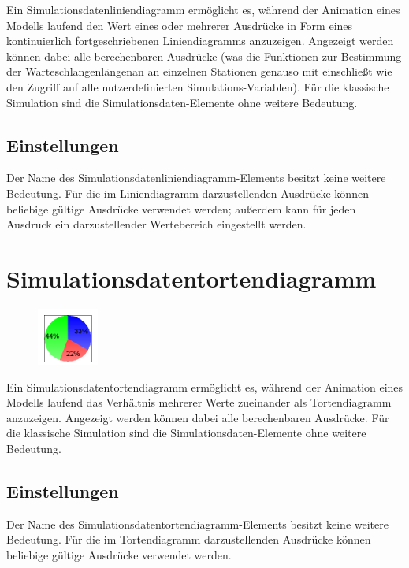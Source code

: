 Ein Simulationsdatenliniendiagramm ermöglicht es, während der Animation eines Modells laufend den Wert
eines oder mehrerer Ausdrücke in Form eines kontinuierlich fortgeschriebenen Liniendiagramms anzuzeigen.
Angezeigt werden können dabei alle berechenbaren Ausdrücke (was die Funktionen zur Bestimmung der
Warteschlangenlängenan an einzelnen Stationen genauso mit einschließt wie den Zugriff auf alle
nutzerdefinierten Simulations-Variablen). Für die klassische Simulation sind die
Simulationsdaten-Elemente ohne weitere Bedeutung.

\subsection*{Einstellungen}

Der Name des Simulationsdatenliniendiagramm-Elements besitzt keine weitere Bedeutung. Für die im
Liniendiagramm darzustellenden Ausdrücke können beliebige gültige Ausdrücke verwendet werden;
außerdem kann für jeden Ausdruck ein darzustellender Wertebereich eingestellt werden.


\section{Simulationsdatentortendiagramm}
\label{ref:ModelElementAnimationPieChart}

\begin{figure}
\vspace{-22pt}
\includegraphics[width=2cm]{imageModelElementAnimationPieChart.png}
\vspace{-22pt}
\end{figure}

Ein Simulationsdatentortendiagramm ermöglicht es, während der Animation eines Modells laufend 
das Verhältnis mehrerer Werte zueinander als Tortendiagramm anzuzeigen.
Angezeigt werden können dabei alle berechenbaren Ausdrücke. Für die klassische Simulation sind die
Simulationsdaten-Elemente ohne weitere Bedeutung.

\subsection*{Einstellungen}

Der Name des Simulationsdatentortendiagramm-Elements besitzt keine weitere Bedeutung. Für die im
Tortendiagramm darzustellenden Ausdrücke können beliebige gültige Ausdrücke verwendet werden.


